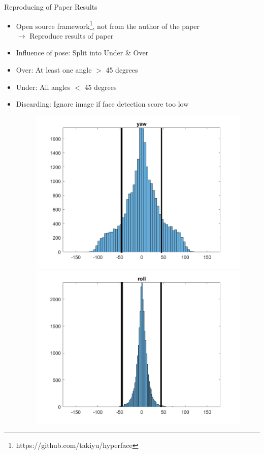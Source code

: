 \documentclass{beamer}
\begin{document}
\begin{frame}{Reproducing of Paper Results}
\begin{itemize}
\item Open source framework\footnote{https://github.com/takiyu/hyperface}, not from the author of the paper\\
$\rightarrow$ Reproduce results of paper
\item Influence of pose: Split into Under \& Over
\item Over: At least one angle $>$ 45 degrees
\item Under: All angles $<$ 45 degrees
\item Discarding: Ignore image if face detection score too low
\begin{figure}
\centering
\includegraphics[scale=0.15]{fig/yaw_dist}
\includegraphics[scale=0.15]{fig/roll_dist}

\end{figure}
\end{itemize}
\end{frame}
\end{document}
